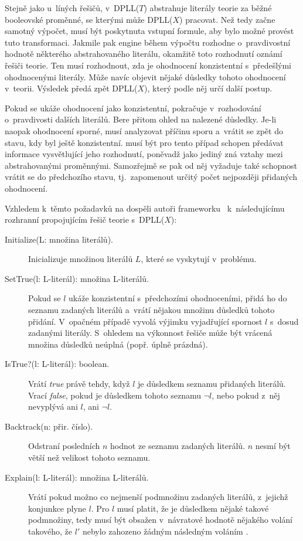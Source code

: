 Stejně jako u~líných řešičů, v~DPLL($T$) abstrahuje \Solver literály teorie za běžné booleovské proměnné, se kterými může DPLL($X$) pracovat. Než tedy začne samotný výpočet, musí být \Solver poskytnuta vstupní formule, aby bylo možné provést tuto transformaci. Jakmile pak engine během výpočtu rozhodne o~pravdivostní hodnotě některého abstrahovaného literálu, okamžitě toto rozhodnutí oznámí řešiči teorie. Ten musí rozhodnout, zda je ohodnocení konzistentní s~předešlými ohodnocenými literály. Může navíc objevit nějaké důsledky tohoto ohodnocení v~teorii. Výsledek \Solver předá zpět DPLL($X$), který podle něj určí další postup. 

Pokud se ukáže ohodnocení jako konzistentní, pokračuje v~rozhodování o~pravdivosti dalších literálů. Bere přitom ohled na nalezené důsledky. Je-li naopak ohodnocení sporné, musí analyzovat příčinu sporu a~vrátit se zpět do stavu, kdy byl ještě konzistentní. \Solver musí být pro tento případ schopen předávat informace vysvětlující jeho rozhodnutí, poněvadž jako jediný zná vztahy mezi abstrahovanými proměnnými. Samozřejmě se pak od něj vyžaduje také schopnost vrátit se do předchozího stavu, tj.~zapomenout určitý počet nejpozději přidaných ohodnocení.

Vzhledem k~těmto požadavků na \Solver dospěli autoři frameworku~\cite{Gazinger04} k~následujícímu rozhranní propojujícím řešič teorie s~DPLL($X$):

\begin{description}
	\item[Initialize(L: množina literálů).] Inicializuje \Solver množinou literálů $L$, které se vyskytují v~problému.
	\item[SetTrue(l: L-literál): množina L-literálů.] Pokud se $l$ ukáže konzistentní s~předchozími ohodnoceními, přidá ho do seznamu zadaných literálů a~vrátí nějakou množinu důsledků tohoto přidání. V~opačném případě vyvolá výjimku vyjadřující spornost $l$ s~dosud zadanými literály. S~ohledem na výkonnost řešiče může být vrácená množina důsledků neúplná (popř. úplně prázdná).
	\item[IsTrue?(l: L-literál): boolean.] Vrátí \emph{true} právě tehdy, když $l$ je důsledkem seznamu přidaných literálů. Vrací \emph{false}, pokud je důsledkem tohoto seznamu $\neg l$, nebo pokud z~něj nevyplývá ani $l$, ani $\neg l$.
	\item[Backtrack(n: přir. číslo).] Odstraní posledních $n$ hodnot ze seznamu zadaných literálů. $n$ nesmí být větší než velikost tohoto seznamu.
	\item[Explain(l: L-literál): množina L-literálů.] Vrátí pokud možno co nejmenší podmnožinu zadaných literálů, z~jejichž konjunkce plyne $l$. Pro $l$ musí platit, že je důsledkem nějaké takové podmnožiny, tedy musí být obsažen v~návratové hodnotě nějakého volání  takového, že $l'$ nebylo zahozeno žádným následným voláním .
\end{description}

